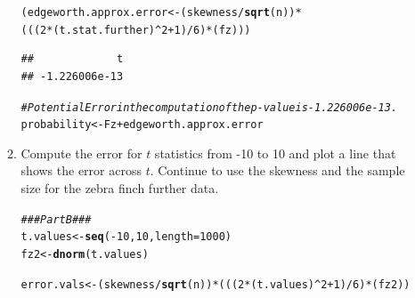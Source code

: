 \documentclass{article}\usepackage[]{graphicx}\usepackage[]{xcolor}
\makeatletter
\newcommand{\hlnum}[1]{\textcolor[rgb]{0.686,0.059,0.569}{#1}}%
\newcommand{\hlcom}[1]{\textcolor[rgb]{0.678,0.584,0.686}{\textit{#1}}}%
\newcommand{\hlopt}[1]{\textcolor[rgb]{0,0,0}{#1}}%
\newcommand{\hldef}[1]{\textcolor[rgb]{0.345,0.345,0.345}{#1}}%
\newcommand{\hlkwb}[1]{\textcolor[rgb]{0.69,0.353,0.396}{#1}}%
\newcommand{\hlkwc}[1]{\textcolor[rgb]{0.333,0.667,0.333}{#1}}%
\newcommand{\hlkwd}[1]{\textcolor[rgb]{0.737,0.353,0.396}{\textbf{#1}}}%
\newenvironment{kframe}{%
 \def\at@end@of@kframe{}%
 \ifinner\ifhmode%
  \def\at@end@of@kframe{\end{minipage}}%
  \begin{minipage}{\columnwidth}%
 \fi\fi%
 \def\FrameCommand##1{\hskip\@totalleftmargin \hskip-\fboxsep
 \colorbox{shadecolor}{##1}\hskip-\fboxsep
     \hskip-\linewidth \hskip-\@totalleftmargin \hskip\columnwidth}%
 \MakeFramed {\advance\hsize-\width
   \@totalleftmargin\z@ \linewidth\hsize
   \@setminipage}}%
 {\par\unskip\endMakeFramed%
 \at@end@of@kframe}
\newenvironment{knitrout}{}{} %
\makeatother
\begin{document}
\begin{enumerate}
\begin{enumerate}
\begin{knitrout}
\begin{kframe}
\begin{alltt}
\hldef{(edgeworth.approx.error} \hlkwb{<-} \hldef{(skewness}\hlopt{/}\hlkwd{sqrt}\hldef{(n))} \hlopt{*}
    \hldef{(((}\hlnum{2}\hlopt{*}\hldef{(t.stat.further)}\hlopt{^}\hlnum{2} \hlopt{+} \hlnum{1}\hldef{)}\hlopt{/}\hlnum{6}\hldef{)}\hlopt{*}\hldef{(fz)))}
\end{alltt}
\begin{verbatim}
##             t 
## -1.226006e-13
\end{verbatim}
\begin{alltt}
\hlcom{# Potential Error in the computation of the p-value is -1.226006e-13.}
\hldef{probability} \hlkwb{<-} \hldef{Fz} \hlopt{+} \hldef{edgeworth.approx.error}
\end{alltt}
\end{kframe}
\end{knitrout}

  \item Compute the error for $t$ statistics from -10 to 10 and plot a line
  that shows the error across $t$. Continue to use the skewness and 
  the sample size for the zebra finch further data.
\begin{knitrout}
\color{fgcolor}\begin{kframe}
\begin{alltt}
\hlcom{### Part B ###}
\hldef{t.values} \hlkwb{<-} \hlkwd{seq}\hldef{(}\hlopt{-}\hlnum{10}\hldef{,}\hlnum{10}\hldef{,} \hlkwc{length} \hldef{=} \hlnum{1000}\hldef{)}
\hldef{fz2} \hlkwb{<-} \hlkwd{dnorm}\hldef{(t.values)}

\hldef{error.vals} \hlkwb{<-} \hldef{(skewness}\hlopt{/}\hlkwd{sqrt}\hldef{(n))} \hlopt{*} \hldef{(((}\hlnum{2}\hlopt{*}\hldef{(t.values)}\hlopt{^}\hlnum{2} \hlopt{+} \hlnum{1}\hldef{)}\hlopt{/}\hlnum{6}\hldef{)}\hlopt{*}\hldef{(fz2))}


\end{alltt}
\end{kframe}
\end{knitrout}
\end{enumerate}
\end{enumerate}
\end{document}
